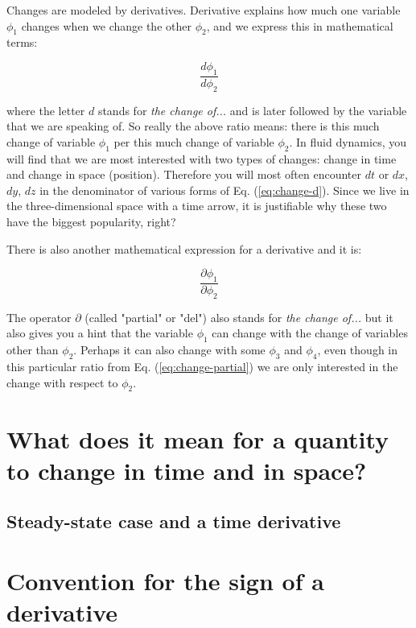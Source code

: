 Changes are modeled by derivatives. Derivative explains how much one variable $\phi_1$ changes when we change the other $\phi_2$, and we express this in mathematical terms:

\begin{equation}\label{eq:change-d}
\frac{d \phi_1}{d \phi_2}
\end{equation}

where the letter $d$ stands for \textit{the change of...} and is later followed by the variable that we are speaking of. So really the above ratio means: there is this much change of variable $\phi_1$ per this much change of variable $\phi_2$. In fluid dynamics, you will find that we are most interested with two types of changes: change in time and change in space (position). Therefore you will most often encounter $dt$ or $dx$, $dy$, $dz$ in the denominator of various forms of Eq. (\ref{eq:change-d}). Since we live in the three-dimensional space with a time arrow, it is justifiable why these two have the biggest popularity, right?

There is also another mathematical expression for a derivative and it is:

\begin{equation}\label{eq:change-partial}
\frac{\partial \phi_1}{\partial \phi_2}
\end{equation}

The operator $\partial$ (called "partial" or "del") also stands for \textit{the change of...} but it also gives you a hint that the variable $\phi_1$ can change with the change of variables other than $\phi_2$. Perhaps it can also change with some $\phi_3$ and $\phi_4$, even though in this particular ratio from Eq. (\ref{eq:change-partial}) we are only interested in the change with respect to $\phi_2$.

\section{What does it mean for a quantity to change in time and in space?}


\subsection{Steady-state case and a time derivative}

\section{Convention for the sign of a derivative}

